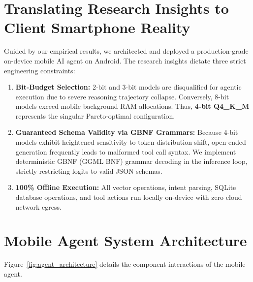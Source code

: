 \documentclass[12pt,a4paper,oneside]{report}
\begin{document}
\section{Translating Research Insights to Client Smartphone Reality}
Guided by our empirical results, we architected and deployed a production-grade on-device mobile AI agent on Android. The research insights dictate three strict engineering constraints:
\begin{enumerate}
    \item \textbf{Bit-Budget Selection:} 2-bit and 3-bit models are disqualified for agentic execution due to severe reasoning trajectory collapse. Conversely, 8-bit models exceed mobile background RAM allocations. Thus, \textbf{4-bit Q4\_K\_M} represents the singular Pareto-optimal configuration.
    \item \textbf{Guaranteed Schema Validity via GBNF Grammars:} Because 4-bit models exhibit heightened sensitivity to token distribution shift, open-ended generation frequently leads to malformed tool call syntax. We implement deterministic GBNF (GGML BNF) grammar decoding in the inference loop, strictly restricting logits to valid JSON schemas.
    \item \textbf{100\% Offline Execution:} All vector operations, intent parsing, SQLite database operations, and tool actions run locally on-device with zero cloud network egress.
\end{enumerate}

\section{Mobile Agent System Architecture}
Figure~\ref{fig:agent_architecture} details the component interactions of the mobile agent.
\end{document}

